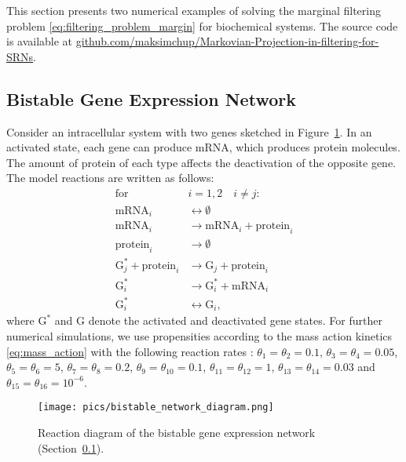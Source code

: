 This section presents two numerical examples of solving the marginal filtering problem \eqref{eq:filtering_problem_margin} for biochemical systems. The source code is available at \href{https://github.com/maksimchup/Markovian-Projection-in-filtering-for-SRNs}{github.com/maksimchup/Markovian-Projection-in-filtering-for-SRNs}.

\subsection{Bistable Gene Expression Network}
\label{subsec:bistable_gene}
Consider an intracellular system with two genes \cite{Duso2018SelectedNodeSSA} sketched in Figure~\ref{fig:bistable_gene_diagram}. In an activated state, each gene can produce mRNA, which produces protein molecules. The amount of protein of each type affects the deactivation of the opposite gene. The model reactions are written as follows:
\begin{align*}
    \text{for } &i = 1,2 \quad i \neq j: \\[1.5pt]
    \text{mRNA}_i &\longleftrightarrow \emptyset \\
    \text{mRNA}_i &\longrightarrow \text{mRNA}_i + \text{protein}_i \\
    \text{protein}_i &\longrightarrow \emptyset \\
    \text{G}^\ast_j + \text{protein}_i &\longrightarrow \text{G}_j + \text{protein}_i  \\
    \text{G}^\ast_i &\longrightarrow \text{G}^\ast_i + \text{mRNA}_i \\
    \text{G}^\ast_i &\longleftrightarrow \text{G}_i,
\end{align*}
where $\text{G}^{\ast}$ and $\text{G}$ denote the activated and deactivated gene states.
For further numerical simulations, we use propensities according to the mass action kinetics \eqref{eq:mass_action} with the following reaction rates \cite{Duso2018SelectedNodeSSA}: $\theta_1 = \theta_2 = 0.1$, $\theta_3 = \theta_4 = 0.05$, $\theta_5 = \theta_6 = 5$, $\theta_7 = \theta_8 = 0.2$, $\theta_9 = \theta_{10} = 0.1$, $\theta_{11} = \theta_{12} = 1$, $\theta_{13} = \theta_{14} = 0.03$ and $\theta_{15} = \theta_{16} = 10^{-6}$.

\begin{figure}
    \centering
    \texttt{[image: pics/bistable\_network\_diagram.png]}
    \caption{Reaction diagram of the bistable gene expression network (Section~\ref{subsec:bistable_gene}).}
    \label{fig:bistable_gene_diagram}
\end{figure}

